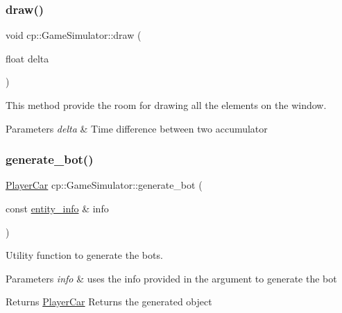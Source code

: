 \subsubsection{\texorpdfstring{draw()}{draw()}}
{\footnotesize\ttfamily void cp\+::\+Game\+Simulator\+::draw (\begin{DoxyParamCaption}\item[{float}]{delta }\end{DoxyParamCaption})}



This method provide the room for drawing all the elements on the window. 


\begin{DoxyParams}{Parameters}
{\em delta} & Time difference between two accumulator \\
\hline
\end{DoxyParams}
\mbox{\label{classcp_1_1_game_simulator_ae0a0e21217dfffba34e067ebc77c9031}} 
\subsubsection{\texorpdfstring{generate\+\_\+bot()}{generate\_bot()}}
{\footnotesize\ttfamily \hyperlink{classcp_1_1_player_car}{Player\+Car} cp\+::\+Game\+Simulator\+::generate\+\_\+bot (\begin{DoxyParamCaption}\item[{const \hyperlink{classcp_1_1entity__info}{entity\+\_\+info} \&}]{info }\end{DoxyParamCaption})}



Utility function to generate the bots. 


\begin{DoxyParams}{Parameters}
{\em info} & uses the info provided in the argument to generate the bot \\
\hline
\end{DoxyParams}
\begin{DoxyReturn}{Returns}
\hyperlink{classcp_1_1_player_car}{Player\+Car} Returns the generated object 
\end{DoxyReturn}
\mbox{\label{classcp_1_1_game_simulator_a2997be5cd3e69cd47f12cf36739d1c86}} 
